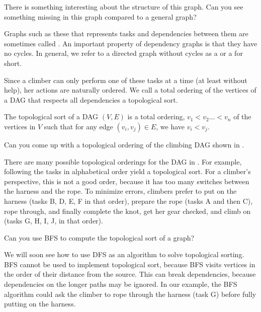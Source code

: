 \begin{question}
There is something interesting about the structure of this graph.  Can
you see something missing in this graph compared to a general graph?
\end{question}

Graphs such as these that represents tasks and dependencies between
them are sometimes called .
%
An important property of dependency graphs is that they have no
cycles.
%
In general, we refer to a directed graph without cycles as a
 or a  for short.


Since a climber can only perform one of these tasks at a time (at
least without help), her
actions are naturally ordered. We call a total ordering of the
vertices of a DAG that respects all dependencies a topological sort.

\begin{definition}
  The topological sort of a DAG $(V,E)$ is a total ordering, $v_1 < v_2
  \ldots < v_n$ of the vertices in $V$ such that for any edge $(v_i,
  v_j) \in E$, we have $v_i < v_j$.
\end{definition}

\begin{question}
Can you come up with a topological ordering of the climbing DAG shown
in .
\end{question}

There are many possible topological orderings for the DAG in
.  For example, following the tasks in
alphabetical order yield a topological sort.  For a climber's
perspective, this is not a good order, because it has too many switches
between the harness and the rope.  
%
To minimize errors, climbers prefer to put on the harness (tasks B, D,
E, F in that order), prepare the rope (tasks A and then C), rope
through, and finally complete the knot, get her gear checked, and
climb on (tasks G, H, I, J, in that order).

\begin{question}
Can you use BFS to compute the topological sort of a graph?
\end{question}

We will soon see how to use DFS as an algorithm to solve topological
sorting.
%
BFS cannot be used to implement topological sort,
because BFS visits vertices in the order of their distance from the
source. This can break dependencies, because dependencies on the
longer paths may be ignored.
%
In our example, the BFS algorithm could ask the climber to rope
through the harness (task G) before fully putting on the harness.


